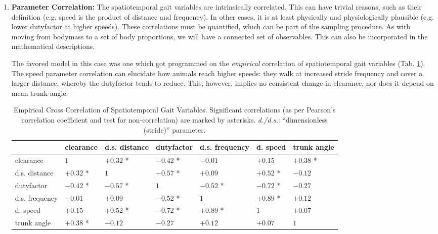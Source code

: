 \begin{enumerate}
\item \textbf{Parameter Correlation:}
\label{sec:orgccc0e5d}
The spatiotemporal gait variables are intrinsically correlated.
This can have trivial reasons, such as their definition (e.g. speed is the product of distance and frequency).
In other cases, it is at least physically and physiologically plausible (e.g. lower dutyfactor at higher speeds).
These correlations must be quantified, which can be part of the sampling procedure.
As with moving from bodymass to a set of body proportions, we will have a connected set of observables.
This can also be incorporated in the mathematical descriptions.


The favored model in this case was one which got programmed on the \emph{empirical} correlation of spatiotemporal gait variables (Tab. \ref{tab:stridecorrelation}).
The speed parameter correlation can elucidate how animals reach higher speeds: they walk at increased stride frequency and cover a larger distance, whereby the dutyfactor tends to reduce.
This, however, implies no consistent change in clearance, nor does it depend on mean trunk angle.

\begin{table}[p]
\caption{\label{tab:stridecorrelation}Empirical Cross Correlation of Spatiotemporal Gait Variables. Significant correlations (as per Pearson's correlation coefficient and test for non-correlation) are marked by asterisks. \emph{d./d.s.}: ``dimensionless (stride)'' parameter.}
\centering
\begin{footnotesize}
\begin{tabular}{l|llllll}
 & clearance & d.s. distance & dutyfactor & d.s. frequency & d. speed & trunk angle\\[0pt]
\hline
clearance & \(1\) & \(+0.32\) * & \(-0.42\) * & \(-0.01\) & \(+0.15\) & \(+0.38\) *\\[0pt]
d.s. distance & \(+0.32\) * & \(1\) & \(-0.57\) * & \(+0.09\) & \(+0.52\) * & \(-0.12\)\\[0pt]
dutyfactor & \(-0.42\) * & \(-0.57\) * & \(1\) & \(-0.52\) * & \(-0.72\) * & \(-0.27\)\\[0pt]
d.s. frequency & \(-0.01\) & \(+0.09\) & \(-0.52\) * & \(1\) & \(+0.89\) * & \(+0.12\)\\[0pt]
d. speed & \(+0.15\) & \(+0.52\) * & \(-0.72\) * & \(+0.89\) * & \(1\) & \(+0.07\)\\[0pt]
trunk angle & \(+0.38\) * & \(-0.12\) & \(-0.27\) & \(+0.12\) & \(+0.07\) & \(1\)\\[0pt]
\end{tabular}
\end{footnotesize}
\end{table}




\end{enumerate}
